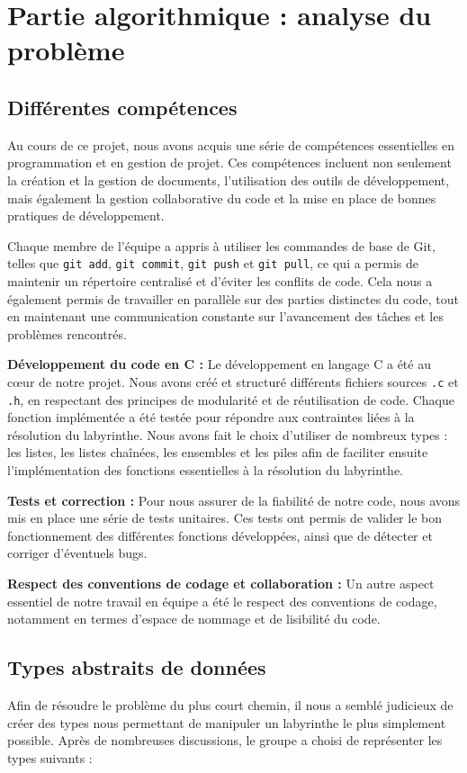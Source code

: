 \chapter{Partie algorithmique : analyse du problème}

\section{Différentes compétences}
Au cours de ce projet, nous avons acquis une série de compétences essentielles en programmation et en gestion de projet. Ces compétences incluent non seulement la création et la gestion de documents, l'utilisation des outils de développement, mais également la gestion collaborative du code et la mise en place de bonnes pratiques de développement.

Chaque membre de l’équipe a appris à utiliser les commandes de base de Git, telles que \texttt{git add}, \texttt{git commit}, \texttt{git push} et \texttt{git pull}, ce qui a permis de maintenir un répertoire centralisé et d’éviter les conflits de code. Cela nous a également permis de travailler en parallèle sur des parties distinctes du code, tout en maintenant une communication constante sur l’avancement des tâches et les problèmes rencontrés. 

\textbf{Développement du code en C :} Le développement en langage C a été au cœur de notre projet. Nous avons créé et structuré différents fichiers sources \texttt{.c} et \texttt{.h}, en respectant des principes de modularité et de réutilisation de code. Chaque fonction implémentée a été testée pour répondre aux contraintes liées à la résolution du labyrinthe. Nous avons fait le choix d'utiliser de nombreux types : les listes, les listes chaînées, les ensembles et les piles afin de faciliter ensuite l'implémentation des fonctions essentielles à la résolution du labyrinthe. 

\textbf{Tests et correction :} Pour nous assurer de la fiabilité de notre code, nous avons mis en place une série de tests unitaires. Ces tests ont permis de valider le bon fonctionnement des différentes fonctions développées, ainsi que de détecter et corriger d'éventuels bugs. 

\textbf{Respect des conventions de codage et collaboration :} Un autre aspect essentiel de notre travail en équipe a été le respect des conventions de codage, notamment en termes d’espace de nommage et de lisibilité du code.

\section{Types abstraits de données}
Afin de résoudre le problème du plus court chemin, il nous a semblé judicieux de créer des types nous permettant de manipuler un labyrinthe le plus simplement possible. Après de nombreuses discussions, le groupe a choisi de représenter les types suivants :\\

